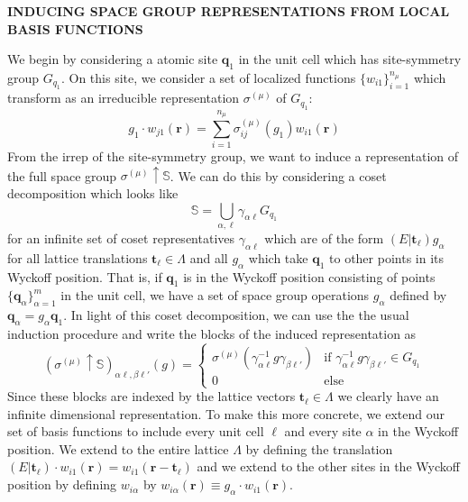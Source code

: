 \documentclass[9 pt]{report}
\def\*#1{\boldsymbol{#1}}
\begin{document}
\begin{center}
\textbf{INDUCING SPACE GROUP REPRESENTATIONS FROM LOCAL BASIS FUNCTIONS}
\end{center}

\noindent We begin by considering a atomic site $\*q_1$ in the unit cell which has site-symmetry group $G_{q_1}$. On this site, we consider a set of localized functions $\{w_{i1}\}_{i=1}^{n_\mu}$ which transform as an irreducible representation $\sigma^{(\mu)}$ of $G_{q_1}$:
$$ g_1\cdot w_{j1}(\*r) = \sum_{i=1}^{n_\mu} \sigma^{(\mu)}_{ij}(g_1)w_{i1}(\*r) $$
From the irrep of the site-symmetry group, we want to induce a representation of the full space group $\sigma^{(\mu)}\uparrow\mathbb{S}$. We can do this by considering a coset decomposition which looks like
$$ \mathbb{S} = \bigcup_{\alpha,\ell}\gamma_{\alpha\ell} G_{q_1} $$
for an infinite set of coset representatives $\gamma_{\alpha\ell}$ which are of the form $(E|\*t_\ell)g_\alpha$ for all lattice translations $\*t_\ell\in\Lambda$ and all $g_\alpha$ which take $\*q_1$ to other points in its Wyckoff position. That is, if $\*q_1$ is in the Wyckoff position consisting of points $\{ \*q_\alpha \}_{\alpha=1}^m$ in the unit cell, we have a set of space group operations $g_\alpha$ defined by $\*q_\alpha = g_\alpha \*q_{1}$. In light of this coset decomposition, we can use the the usual induction procedure and write the blocks of the induced representation as
$$ (\sigma^{(\mu)}\uparrow\mathbb{S})_{\alpha\ell,\beta\ell'}(g) = \begin{cases} \sigma^{(\mu)}(\gamma_{\alpha\ell}^{-1}g\gamma_{\beta\ell'}) & \text{if } \gamma_{\alpha\ell}^{-1}g\gamma_{\beta\ell'} \in G_{q_1} \\
0 & \text{else}\end{cases} $$
Since these blocks are indexed by the lattice vectors $\*t_\ell\in\Lambda$ we clearly have an infinite dimensional representation. To make this more concrete, we extend our set of basis functions to include every unit cell $\ell$ and every site $\alpha$ in the Wyckoff position. We extend to the entire lattice $\Lambda$ by defining the translation $(E|\*t_\ell)\cdot w_{i1}(\*r)=w_{i1}(\*r-\*t_\ell)$ and we extend to the other sites in the Wyckoff position by defining $w_{i\alpha}$ by $w_{i\alpha}(\*r) \equiv g_\alpha \cdot w_{i1}(\*r)$.
\end{document}
